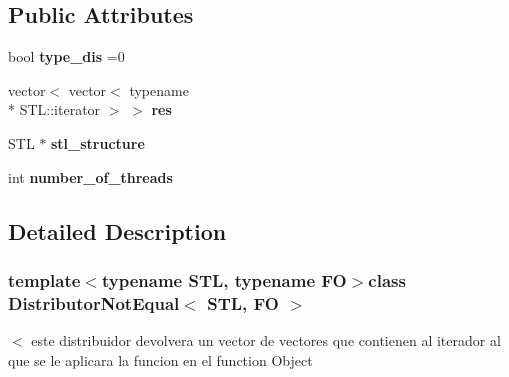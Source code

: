 \subsection*{Public Attributes}
\begin{DoxyCompactItemize}
\item 
\hypertarget{class_distributor_not_equal_aacfb373dcf12ede0b4c72dcf03eafddf}{bool {\bfseries type\-\_\-dis} =0}\label{class_distributor_not_equal_aacfb373dcf12ede0b4c72dcf03eafddf}

\item 
\hypertarget{class_distributor_not_equal_aca69c6491263ed7fc736c5fad7dffd58}{vector$<$ vector$<$ typename \\*
S\-T\-L\-::iterator $>$ $>$ {\bfseries res}}\label{class_distributor_not_equal_aca69c6491263ed7fc736c5fad7dffd58}

\item 
\hypertarget{class_distributor_not_equal_af551c63ba4819d8b4361d6c5f87b5937}{S\-T\-L $\ast$ {\bfseries stl\-\_\-structure}}\label{class_distributor_not_equal_af551c63ba4819d8b4361d6c5f87b5937}

\item 
\hypertarget{class_distributor_not_equal_a6a1795ab6d09a19f734d3f13b9f04458}{int {\bfseries number\-\_\-of\-\_\-threads}}\label{class_distributor_not_equal_a6a1795ab6d09a19f734d3f13b9f04458}

\end{DoxyCompactItemize}


\subsection{Detailed Description}
\subsubsection*{template$<$typename S\-T\-L, typename F\-O$>$class Distributor\-Not\-Equal$<$ S\-T\-L, F\-O $>$}

$<$ este distribuidor devolvera un vector de vectores que contienen al iterador al que se le aplicara la funcion en el function Object 

